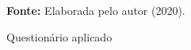 \begin{figure}[ht!]
\centering

\caption{\textmd{Questionário aplicado}}
\label{fig:questionario2}

\par\medskip\textbf{Fonte:} Elaborada pelo autor (2020). \par\medskip

\end{figure}
